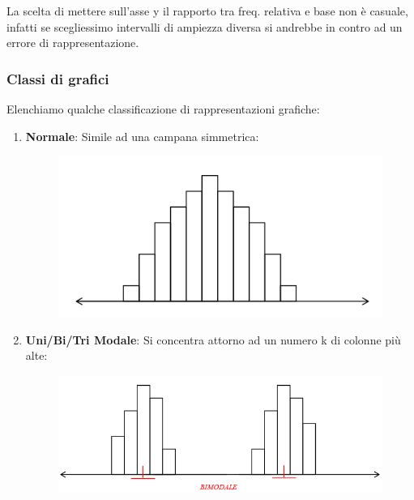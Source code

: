 \documentclass{article}
\begin{document}
\begin{enumerate}
\vspace*{8px}

La scelta di mettere sull'asse y il rapporto tra freq. relativa e base non è casuale, infatti se scegliessimo intervalli di ampiezza diversa si andrebbe in contro ad un errore di rappresentazione.

\end{enumerate}

\newpage

\subsubsection{Classi di grafici}

Elenchiamo qualche classificazione di rappresentazioni grafiche:

\begin{enumerate}
    \item \textbf{Normale}: Simile ad una campana simmetrica:
    \begin{figure}[htbp]
        \center
        \includegraphics[scale=0.5]{img/normale.png}
    \end{figure}
    \vspace*{8px}

    \item \textbf{Uni/Bi/Tri Modale}: Si concentra attorno ad un numero k di colonne più alte:
    \begin{figure}[htbp]
        \center
        \includegraphics[scale=0.5]{img/modale.png}
    \end{figure}
    \vspace*{8px}


\end{enumerate}
\end{document}
